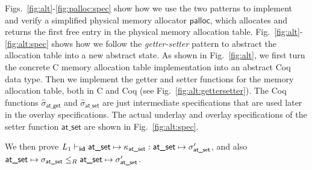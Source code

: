 Figs.~\ref{fig:alt}-\ref{fig:palloc:spec} show how we use the two
patterns to implement and verify a simplified physical memory
allocator $\textsf{palloc}$, which allocates and returns the
first free entry in the physical memory allocation table.
Fig.~\ref{fig:alt}-\ref{fig:alt:spec} shows how we follow
the {\it getter-setter} pattern
to abstract the allocation table into a new abstract state.
As shown in Fig.~\ref{fig:alt}, we first turn the concrete C
memory allocation table implementation into an abstract Coq data
type. Then we implement the getter and setter functions for the
memory allocation table, both in C and Coq (see Fig.~\ref{fig:alt:gettersetter}). 
The Coq functions $\hat{\sigma}_\textsf{at\_get}$ and $\hat{\sigma}_\textsf{at\_set}$
are just intermediate specifications that are used
later in the overlay specifications.
The actual underlay and overlay specifications of the setter
function $\textsf{at\_set}$ are shown in Fig.~\ref{fig:alt:spec}.

We then prove
$L_1 \vdash_{\textbf{id}} \textsf{at\_set} \mapsto \kappa_\textsf{at\_set} : \textsf{at\_set} \mapsto \sigma'_\textsf{at\_set}$,
and also 
$\textsf{at\_set} \mapsto \sigma_\textsf{at\_set}\le_{R}\textsf{at\_set} \mapsto \sigma'_\textsf{at\_set}$.

